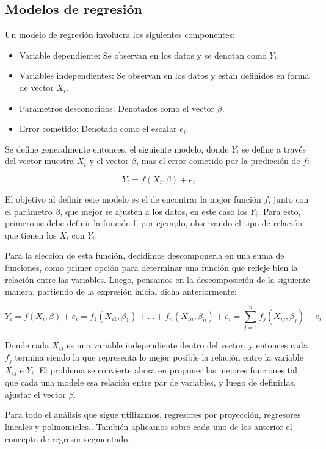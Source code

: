 \subsection{Modelos de regresión}
        
    Un modelo de regresión involucra los siguientes componentes:
    \begin{itemize}
        \item Variable dependiente: Se observan en los datos y se denotan como $Y_i$.
        \item Variables independientes: Se observan en los datos y están definidos en forma de vector $X_i$.
        \item Parámetros desconocidos: Denotados como el vector $\beta$. 
        \item Error cometido: Denotado como el escalar $e_i$.
    \end{itemize}
    
    Se define generalmente entonces, el siguiente modelo, donde $Y_i$ se define a través del vector muestra $X_i$ y el vector $\beta$, mas el error cometido por la predicción de $f$:
    
    \[ Y_i = f(X_i,\beta) + e_i \]
    
    El objetivo al definir este modelo es el de encontrar la mejor función $f$, junto con el parámetro $\beta$, que mejor se ajusten a los datos, en este caso los $Y_i$. Para esto, primero se debe definir la función f, por ejemplo, observando el tipo de relación que tienen los $X_i$ con $Y_i$.
    
    Para la elección de esta función, decidimos descomponerla en una suma de funciones, como primer opción para determinar una función que refleje bien la relación entre las variables. Luego, pensamos en la descomposición de la siguiente manera, partiendo de la expresión inicial dicha anteriormente:
    
    \[ Y_i = f(X_i,\beta) + e_i = f_1(X_{i1},\beta_1) +\ldots + f_n(X_{in},\beta_n) + e_i = \sum_{j=1}^{n} f_j(X_{ij},\beta_j) + e_i\]
    
    Donde cada $X_{ij}$ es una variable independiente dentro del vector, y entonces cada $f_j$ termina siendo la que representa lo mejor posible la relación entre la variable $X_{ij}$ e $Y_{i}$. El problema se convierte ahora en proponer las mejores funciones tal que cada una modele esa relación entre par de variables, y luego de definirlas, ajustar el vector $\beta$.
    
    Para todo el análisis que sigue utilizamos,  regresores por proyección, regresores lineales y polinomiales.. También aplicamos sobre cada uno de los anterior el concepto de regresor segmentado.
      
